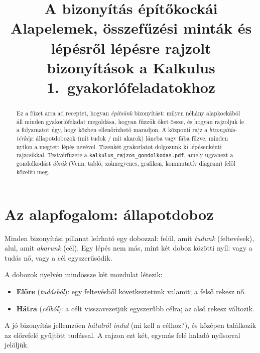 \documentclass[11pt,a4paper]{article}
\title{\textbf{A bizonyítás építőkockái}\\[2mm]
\large Alapelemek, összefűzési minták és lépésről lépésre rajzolt bizonyítások
a Kalkulus 1.\ gyakorlófeladatokhoz}
\author{}
\date{}
\newcommand{\lean}[1]{\texttt{\small #1}}
\theoremstyle{definition}
\begin{document}
\sloppy
\maketitle

\begin{abstract}
Ez a füzet arra ad receptet, hogyan \emph{építsünk} bizonyítást: milyen néhány
alapkockából áll minden gyakorlófeladat megoldása, hogyan fűzzük őket össze, és hogyan
rajzoljuk le a folyamatot úgy, hogy közben ellenőrizhető maradjon. A központi rajz a
\emph{bizonyítás-térkép}: állapotdobozok (mit tudok / mit akarok) láncba vagy fába fűzve,
minden nyílon a megtett lépés nevével. Tizenkét gyakorlatot dolgozunk ki lépésenkénti
rajzcsíkkal. Testvérfüzete a \lean{kalkulus\_rajzos\_gondolkodas.pdf}, amely ugyanezt a
gondolkodást \emph{ábrák} (Venn, tabló, számegyenes, grafikon, kommutatív diagram)
felől közelíti meg.
\end{abstract}

\tableofcontents

\section{Az alapfogalom: állapotdoboz}

Minden bizonyítási pillanat leírható egy dobozzal: felül, amit \emph{tudunk}
(feltevések), alul, amit \emph{akarunk} (cél). Egy lépés nem más, mint két doboz közötti
nyíl: vagy a tudás nő, vagy a cél egyszerűsödik.

\begin{center}
\end{center}

\noindent A dobozok nyelvén mindössze két mozdulat létezik:
\begin{itemize}[nosep,leftmargin=*]
  \item \textbf{Előre} (\emph{tudásból}): egy feltevésből következtetünk valamit; a felső rekesz nő.
  \item \textbf{Hátra} (\emph{célból}): a célt visszavezetjük egyszerűbb célra; az alsó rekesz változik.
\end{itemize}
A jó bizonyítás jellemzően \emph{hátulról indul} (mi kell a célhoz?), és középen találkozik
az előrefelé gyűjtött tudással. A rajzon ezt két, egymás felé haladó nyílsorral jelöljük.
\end{document}
